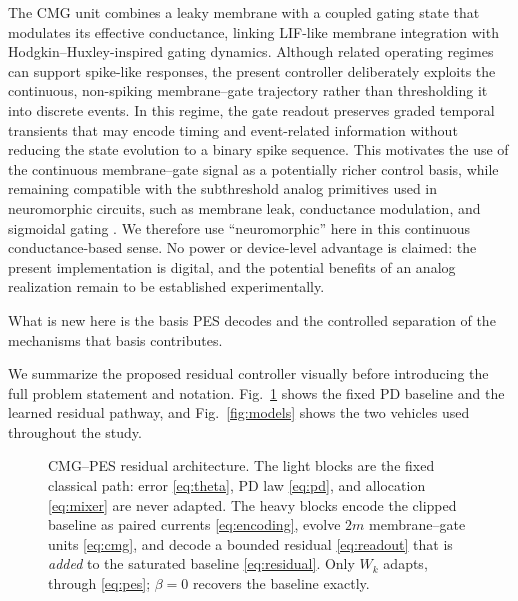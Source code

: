 \documentclass[letterpaper, 10 pt, conference]{ieeeconf}
\begin{document}
The CMG unit combines a leaky membrane with a coupled gating state that modulates its effective conductance, linking LIF-like membrane integration with Hodgkin--Huxley-inspired gating dynamics. Although related operating regimes can support spike-like responses, the present controller deliberately exploits the continuous, non-spiking membrane--gate trajectory rather than thresholding it into discrete events. In this regime, the gate readout preserves graded temporal transients that may encode timing and event-related information without reducing the state evolution to a binary spike sequence. This motivates the use of the continuous membrane--gate signal as a potentially richer control basis, while remaining compatible with the subthreshold analog primitives used in neuromorphic circuits, such as membrane leak, conductance modulation, and sigmoidal gating \cite{mahowald1991vlsi}. We therefore use ``neuromorphic'' here in this continuous conductance-based sense. No power or device-level advantage is claimed: the present implementation is digital, and the potential benefits of an analog realization remain to be established experimentally.

What is new
here is the basis PES decodes and the controlled separation of the mechanisms
that basis contributes.

We summarize the proposed residual controller visually before introducing the full
problem statement and notation. Fig.~\ref{fig:arch} shows the fixed PD baseline
and the learned residual pathway, and Fig.~\ref{fig:models} shows the two
vehicles used throughout the study.

\begin{figure}[t]

\centering
\resizebox{\textwidth}{!}{}
\caption{CMG--PES residual architecture. The light blocks are the fixed
classical path: error \eqref{eq:theta}, PD law \eqref{eq:pd}, and
allocation \eqref{eq:mixer} are never adapted. The heavy blocks encode the
clipped baseline as paired currents \eqref{eq:encoding}, evolve $2m$
membrane--gate units \eqref{eq:cmg}, and decode a bounded residual
\eqref{eq:readout} that is \emph{added} to the saturated baseline
\eqref{eq:residual}. Only $W_k$ adapts, through \eqref{eq:pes}; $\beta=0$
recovers the baseline exactly.}
\label{fig:arch}
\end{figure}
\end{document}

